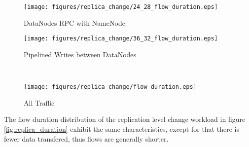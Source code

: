 \begin{figure*}[!htbp]
\centering
  \begin{subfigure}[b]{.45\linewidth}
   \centering
	\texttt{[image: figures/replica\_change/24\_28\_flow\_duration.eps]} 
	\caption{DataNodes RPC with NameNode}\label{fig:replica_duration:rpc}
   \end{subfigure}%
  \begin{subfigure}[b]{.45\linewidth}
   \centering
	\texttt{[image: figures/replica\_change/36\_32\_flow\_duration.eps]} 
	\caption{Pipelined Writes between DataNodes}\label{fig:replica_duration:pipe_write}
   \end{subfigure} \\%
  \begin{subfigure}[b]{.55\linewidth}
   \centering
	\texttt{[image: figures/replica\_change/flow\_duration.eps]}
	\caption{All Traffic}\label{fig:read_duration:all}
   \end{subfigure}%
\caption{Replciation Level Change Flow Duration Distribution}
\label{fig:replica_duration}
\end{figure*}

The flow duration distribution of the replication level change workload in figure \ref{fig:replica_duration} exhibit the same characteristics, except for that there is fewer data transfered, thus flows are generally shorter. 

